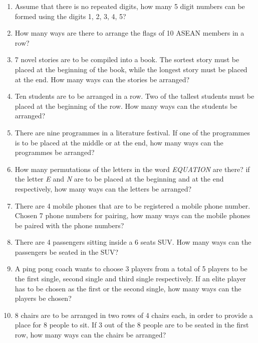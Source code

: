 \documentclass{report}
\begin{document}
\begin{multicols}{2}
  \begin{enumerate}
    \item Assume that there is no repeated digits, how many 5 digit numbers can be formed
          using the digits 1, 2, 3, 4, 5?

    \item How many ways are there to arrange the flags of 10 ASEAN members in a row?

    \item 7 novel stories are to be compiled into a book. The sortest story must be placed
          at the beginning of the book, while the longest story must be placed at the end. How many ways can the stories be arranged?

    \item Ten students are to be arranged in a row. Two of the tallest students must be
          placed at the beginning of the row. How many ways can the students be arranged?

    \item There are nine programmes in a literature festival. If one of the programmes is
          to be placed at the middle or at the end, how many ways can the programmes be
          arranged?

    \item How many permutations of the letters in the word \textit{EQUATION} are there?
          if the letter \textit{E} and \textit{N} are to be placed at the beginning and
          at the end respectively, how many ways can the letters be arranged?

    \item There are 4 mobile phones that are to be registered a mobile phone number.
          Chosen 7 phone numbers for pairing, how many ways can the mobile phones be
          paired with the phone numbers?

    \item There are 4 passengers sitting inside a 6 seats SUV. How many ways can the
          passengers be seated in the SUV?

    \item A ping pong coach wants to choose 3 players from a total of 5 players to be the
          first single, second single and third single respectively. If an elite player
          has to be chosen as the first or the second single, how many ways can the
          players be chosen?

    \item 8 chairs are to be arranged in two rows of 4 chairs each, in order to provide a place for 8 people to sit. If 3 out of the 8 people are to be seated in the first row, how many ways can the chairs be arranged?


\end{enumerate}
\end{multicols}
\end{document}
